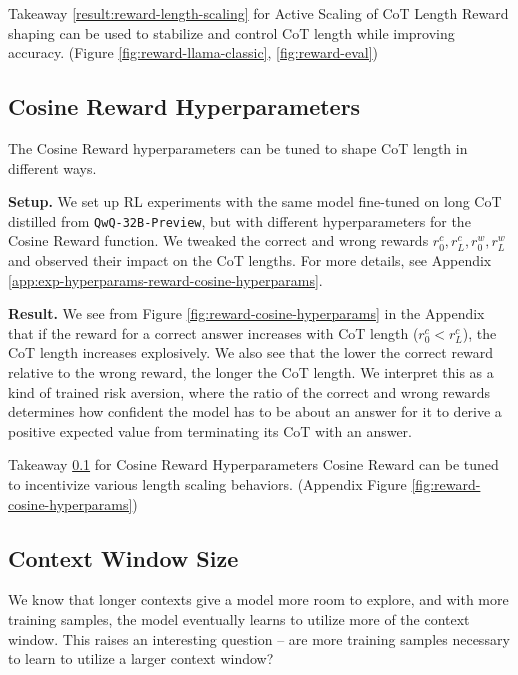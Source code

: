 \begin{AIbox}{Takeaway \hypersetup{hidelinks}\ref{result:reward-length-scaling} for Active Scaling of CoT Length}
Reward shaping can be used to stabilize and control CoT length while improving accuracy. (Figure \ref{fig:reward-llama-classic}, \ref{fig:reward-eval})
\end{AIbox}

\subsection{Cosine Reward Hyperparameters}
\label{result:reward-cosine-hyperparams}

The Cosine Reward hyperparameters can be tuned to shape CoT length in different ways.

\noindent\textbf{Setup.} We set up RL experiments with the same model fine-tuned on long CoT distilled from \texttt{QwQ-32B-Preview}, but with different hyperparameters for the Cosine Reward function. We tweaked the correct and wrong rewards $r_0^c, r_L^c, r_0^w, r_L^w$ and observed their impact on the CoT lengths. For more details, see Appendix \ref{app:exp-hyperparams-reward-cosine-hyperparams}.

\noindent\textbf{Result.} We see from Figure \ref{fig:reward-cosine-hyperparams} in the Appendix that if the reward for a correct answer increases with CoT length ($r_0^c < r_L^c$), the CoT length increases explosively. We also see that the lower the correct reward relative to the wrong reward, the longer the CoT length. We interpret this as a kind of trained risk aversion, where the ratio of the correct and wrong rewards determines how confident the model has to be about an answer for it to derive a positive expected value from terminating its CoT with an answer.

\begin{AIbox}{Takeaway \hypersetup{hidelinks}\ref{result:reward-cosine-hyperparams} for Cosine Reward Hyperparameters}
Cosine Reward can be tuned to incentivize various length scaling behaviors. (Appendix Figure \ref{fig:reward-cosine-hyperparams})
\end{AIbox}

\subsection{Context Window Size}
\label{result:reward-context-window}

We know that longer contexts give a model more room to explore, and with more training samples, the model eventually learns to utilize more of the context window. This raises an interesting question -- are more training samples necessary to learn to utilize a larger context window?

